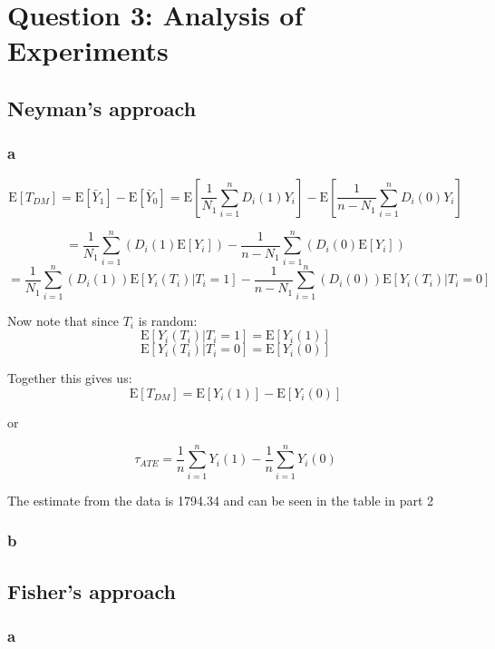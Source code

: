 \documentclass[11pt]{article}
\newcommand{\E}{\mathrm{E}}
\begin{document}
 
 \section{Question 3: Analysis of Experiments}
 
 
 \subsection{Neyman's approach}
 
 \subsubsection{a}
 
 $$\E[T_{DM}] = \E[\bar{Y}_1] - \E[\bar{Y}_0] = \E \left[ \frac{1}{N_1} \sum_{i=1}^{n} D_i(1) Y_i  \right]  
 -  \E \left[ \frac{1}{n-N_1} \sum_{i=1}^{n} D_i(0) Y_i  \right]  $$
 
 $$ =  \frac{1}{N_1} \sum_{i=1}^{n} \left(  D_i(1) \E[Y_i] \right) - \frac{1}{n-N_1} \sum_{i=1}^{n} \left(  D_i(0) \E[Y_i] \right) $$
 $$=  \frac{1}{N_1} \sum_{i=1}^{n} \left( D_i(1) \right) \E[Y_i(T_i)|T_i = 1]  - \frac{1}{n-N_1} \sum_{i=1}^{n} \left( D_i(0) \right) \E[Y_i(T_i)|T_i =0] $$
 
 Now note that since $T_i$ is random: 
 $$ \E[Y_i(T_i)|T_i = 1] = \E[Y_i(1)] $$
 $$ \E[Y_i(T_i)|T_i = 0] = \E[Y_i(0)] $$
 
 Together this gives us: 
  $$\E[T_{DM}] = \E[Y_i(1)] - \E[Y_i(0)] $$
  
 or
 
 $$\tau_{ATE} = \frac{1}{n} \sum_{i=1}^{n} Y_i(1) - \frac{1}{n} \sum_{i=1}^{n} Y_i(0) $$
 
 The estimate from the data is 1794.34 and can be seen in the table in part 2
 
  \subsubsection{b}
 
 \begin{center}
 	
 \end{center}
 
 \subsection{Fisher's approach}
 \subsubsection{a}
 
\end{document}
